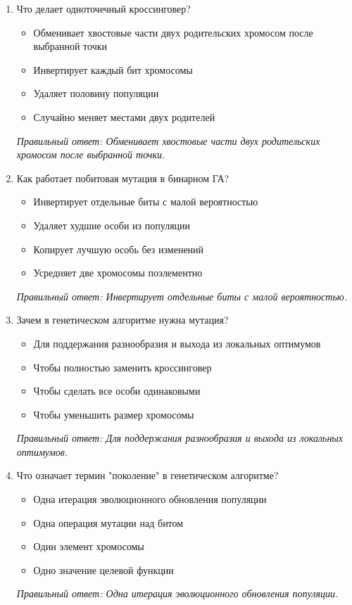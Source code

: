 \begin{enumerate}[label=\textbf{\arabic*.}, leftmargin=0pt, itemsep=1.2em]
\item Что делает одноточечный кроссинговер?
\begin{itemize}[label=$\square$, leftmargin=1.5cm, itemsep=0.2em, topsep=0.3em]
\item Обменивает хвостовые части двух родительских хромосом после выбранной точки
\item Инвертирует каждый бит хромосомы
\item Удаляет половину популяции
\item Случайно меняет местами двух родителей
\end{itemize}
{\small\textit{Правильный ответ: Обменивает хвостовые части двух родительских хромосом после выбранной точки.}}

\item Как работает побитовая мутация в бинарном ГА?
\begin{itemize}[label=$\square$, leftmargin=1.5cm, itemsep=0.2em, topsep=0.3em]
\item Инвертирует отдельные биты с малой вероятностью
\item Удаляет худшие особи из популяции
\item Копирует лучшую особь без изменений
\item Усредняет две хромосомы поэлементно
\end{itemize}
{\small\textit{Правильный ответ: Инвертирует отдельные биты с малой вероятностью.}}

\item Зачем в генетическом алгоритме нужна мутация?
\begin{itemize}[label=$\square$, leftmargin=1.5cm, itemsep=0.2em, topsep=0.3em]
\item Для поддержания разнообразия и выхода из локальных оптимумов
\item Чтобы полностью заменить кроссинговер
\item Чтобы сделать все особи одинаковыми
\item Чтобы уменьшить размер хромосомы
\end{itemize}
{\small\textit{Правильный ответ: Для поддержания разнообразия и выхода из локальных оптимумов.}}

\item Что означает термин "поколение" в генетическом алгоритме?
\begin{itemize}[label=$\square$, leftmargin=1.5cm, itemsep=0.2em, topsep=0.3em]
\item Одна итерация эволюционного обновления популяции
\item Одна операция мутации над битом
\item Один элемент хромосомы
\item Одно значение целевой функции
\end{itemize}
{\small\textit{Правильный ответ: Одна итерация эволюционного обновления популяции.}}


\end{enumerate}
